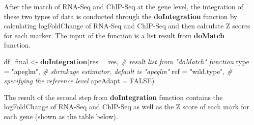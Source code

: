 \documentclass[10pt,]{article}
\newenvironment{Shaded}{\begin{snugshade}}{\end{snugshade}}
\newcommand{\CommentTok}[1]{\textcolor[rgb]{0.56,0.35,0.01}{\textit{#1}}}
\newcommand{\DataTypeTok}[1]{\textcolor[rgb]{0.13,0.29,0.53}{#1}}
\newcommand{\KeywordTok}[1]{\textcolor[rgb]{0.13,0.29,0.53}{\textbf{#1}}}
\newcommand{\NormalTok}[1]{#1}
\newcommand{\OtherTok}[1]{\textcolor[rgb]{0.56,0.35,0.01}{#1}}
\newcommand{\StringTok}[1]{\textcolor[rgb]{0.31,0.60,0.02}{#1}}
\begin{document}
After the match of RNA-Seq and ChIP-Seq at the gene level, the
integration of these two types of data is conducted through the
\textbf{doIntegration} function by calculating logFoldChange of RNA-Seq
and ChIP-Seq and then calculate Z scores for each marker. The input of
the function is a list result from \textbf{doMatch} function.

\begin{Shaded}
\begin{Highlighting}[]
\NormalTok{df_final <-}\StringTok{ }\KeywordTok{doIntegration}\NormalTok{(}\DataTypeTok{res =}\NormalTok{ res, }\CommentTok{# result list from "doMatch" function}
                          \DataTypeTok{type =} \StringTok{"apeglm"}\NormalTok{, }\CommentTok{# shrinkage estimator, default is "apeglm"}
                          \DataTypeTok{ref =} \StringTok{"wild.type"}\NormalTok{, }\CommentTok{# specifying the reference level}
                          \DataTypeTok{apeAdapt =} \OtherTok{FALSE}\NormalTok{)}
\end{Highlighting}
\end{Shaded}

The result of the second step from \textbf{doIntegration} function
contains the logFoldChange of RNA-Seq and ChIP-Seq as well as the Z
score of each mark for each gene (shown as the table below).
\end{document}
